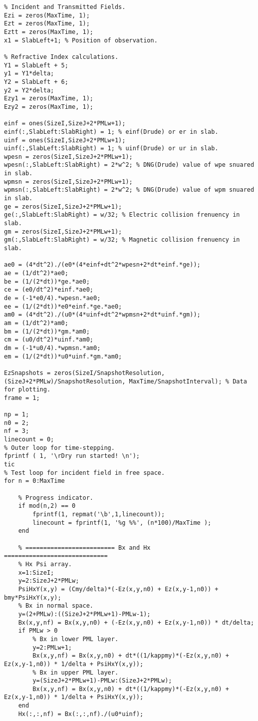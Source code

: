 \begin{lstlisting}
% Incident and Transmitted Fields.
Ezi = zeros(MaxTime, 1);
Ezt = zeros(MaxTime, 1);
Eztt = zeros(MaxTime, 1);
x1 = SlabLeft+1; % Position of observation.

% Refractive Index calculations.
Y1 = SlabLeft + 5;
y1 = Y1*delta;
Y2 = SlabLeft + 6;
y2 = Y2*delta;
Ezy1 = zeros(MaxTime, 1);
Ezy2 = zeros(MaxTime, 1);

einf = ones(SizeI,SizeJ+2*PMLw+1);
einf(:,SlabLeft:SlabRight) = 1; % einf(Drude) or er in slab.
uinf = ones(SizeI,SizeJ+2*PMLw+1);
uinf(:,SlabLeft:SlabRight) = 1; % uinf(Drude) or ur in slab.
wpesn = zeros(SizeI,SizeJ+2*PMLw+1);
wpesn(:,SlabLeft:SlabRight) = 2*w^2; % DNG(Drude) value of wpe snuared in slab.
wpmsn = zeros(SizeI,SizeJ+2*PMLw+1);
wpmsn(:,SlabLeft:SlabRight) = 2*w^2; % DNG(Drude) value of wpm snuared in slab.
ge = zeros(SizeI,SizeJ+2*PMLw+1);
ge(:,SlabLeft:SlabRight) = w/32; % Electric collision frenuency in slab.
gm = zeros(SizeI,SizeJ+2*PMLw+1);
gm(:,SlabLeft:SlabRight) = w/32; % Magnetic collision frenuency in slab.

ae0 = (4*dt^2)./(e0*(4*einf+dt^2*wpesn+2*dt*einf.*ge));
ae = (1/dt^2)*ae0;
be = (1/(2*dt))*ge.*ae0;
ce = (e0/dt^2)*einf.*ae0;
de = (-1*e0/4).*wpesn.*ae0;
ee = (1/(2*dt))*e0*einf.*ge.*ae0;
am0 = (4*dt^2)./(u0*(4*uinf+dt^2*wpmsn+2*dt*uinf.*gm));
am = (1/dt^2)*am0;
bm = (1/(2*dt))*gm.*am0;
cm = (u0/dt^2)*uinf.*am0;
dm = (-1*u0/4).*wpmsn.*am0;
em = (1/(2*dt))*u0*uinf.*gm.*am0;

EzSnapshots = zeros(SizeI/SnapshotResolution, (SizeJ+2*PMLw)/SnapshotResolution, MaxTime/SnapshotInterval); % Data for plotting.
frame = 1;

np = 1;
n0 = 2;
nf = 3;
linecount = 0;
% Outer loop for time-stepping.
fprintf ( 1, '\rDry run started! \n');
tic
% Test loop for incident field in free space.
for n = 0:MaxTime

    % Progress indicator.
    if mod(n,2) == 0
        fprintf(1, repmat('\b',1,linecount));
        linecount = fprintf(1, '%g %%', (n*100)/MaxTime );
    end

    % ========================= Bx and Hx =============================
    % Hx Psi array.
    x=1:SizeI;
    y=2:SizeJ+2*PMLw;
    PsiHxY(x,y) = (Cmy/delta)*(-Ez(x,y,n0) + Ez(x,y-1,n0)) + bmy*PsiHxY(x,y);
    % Bx in normal space.
    y=(2+PMLw):((SizeJ+2*PMLw+1)-PMLw-1);
    Bx(x,y,nf) = Bx(x,y,n0) + (-Ez(x,y,n0) + Ez(x,y-1,n0)) * dt/delta;
    if PMLw > 0
        % Bx in lower PML layer.
        y=2:PMLw+1;
        Bx(x,y,nf) = Bx(x,y,n0) + dt*((1/kappmy)*(-Ez(x,y,n0) + Ez(x,y-1,n0)) * 1/delta + PsiHxY(x,y));
        % Bx in upper PML layer.
        y=(SizeJ+2*PMLw+1)-PMLw:(SizeJ+2*PMLw);
        Bx(x,y,nf) = Bx(x,y,n0) + dt*((1/kappmy)*(-Ez(x,y,n0) + Ez(x,y-1,n0)) * 1/delta + PsiHxY(x,y));
    end
    Hx(:,:,nf) = Bx(:,:,nf)./(u0*uinf);


\end{lstlisting}

